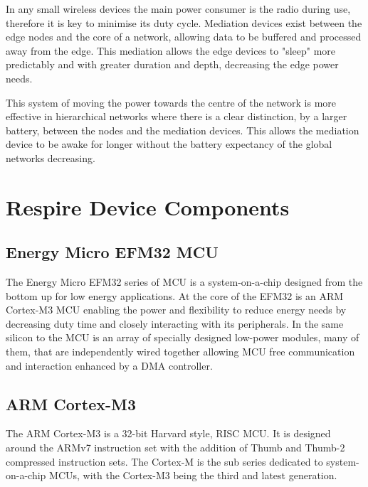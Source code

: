 In any small wireless devices the main power consumer is the radio during use, therefore it is key to
minimise its duty cycle. Mediation devices exist between the edge nodes and the core of a network,
allowing data to be buffered and processed away from the edge. This mediation allows the edge
devices to "sleep" more predictably and with greater duration and depth, decreasing the edge
power needs\cite{Sapio & Tsouri, 2010, Edgar2003}. %


This system of moving the power towards the centre of the network is more effective in hierarchical networks
where there is a clear distinction, \eg by a larger battery, between the nodes
and the mediation devices. This allows the mediation device to be awake for
longer without the battery expectancy of the global networks decreasing.

\section{Respire Device Components}

\subsection{Energy Micro EFM32 \ac{MCU}}
The Energy Micro EFM32 series of \ac{MCU} is a system-on-a-chip designed from the bottom
up for low energy applications. At the core of the EFM32 is an ARM Cortex-M3 \ac{MCU} enabling the
power and flexibility to reduce energy needs by decreasing duty time and closely interacting with its
peripherals. In the same silicon to the \ac{MCU} is an array of specially designed low-power modules,
many of them, that are independently wired together allowing \ac{MCU} free communication and
interaction enhanced by a \ac{DMA} controller.

\subsection{ARM Cortex-M3}
The ARM Cortex-M3 is a 32-bit Harvard style, \ac{RISC} \ac{MCU}. It is designed
around the ARMv7 instruction set with the addition of Thumb
and Thumb-2 compressed instruction sets. The Cortex-M is the sub series dedicated to system-on-a-chip
\acp{MCU}, with the Cortex-M3 being the third and latest generation.


